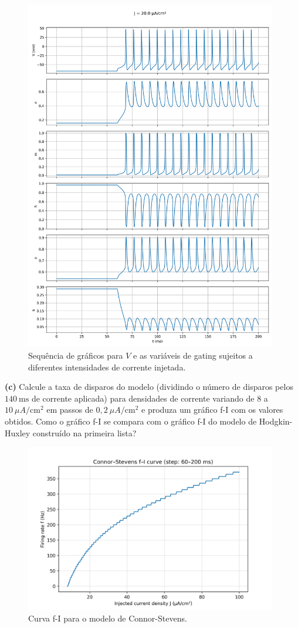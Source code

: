 \documentclass[english,11pt,a4paper]{article}
\begin{document}
	\begin{figure}[H]
	\centering
	\includegraphics[width=11cm]{../figures/ex_1b_4.png}	
	\caption{Sequência de gráficos para $V$ e as variáveis de gating sujeitos a diferentes intensidades de corrente injetada.}
	\end{figure}
	
	\noindent \textbf{(c)} Calcule a taxa de disparos do modelo (dividindo o número de disparos pelos $140 \ \text{ms}$ de corrente aplicada) para densidades de corrente variando de $8$ a $10 \ \mu A/\text{cm}^2$ em passos de $0{,}2 \ \mu A/\text{cm}^2$ e produza um gráfico f-I com os valores obtidos. Como o gráfico f-I se compara com o gráfico f-I do modelo de Hodgkin-Huxley construído na primeira lista?\\
	
	\begin{figure}[H]
		\centering
		\includegraphics[width=11cm]{../figures/ex_1c.png}	
		\caption{Curva f-I para o modelo de Connor-Stevens.}
	\end{figure}
	
\end{document}
